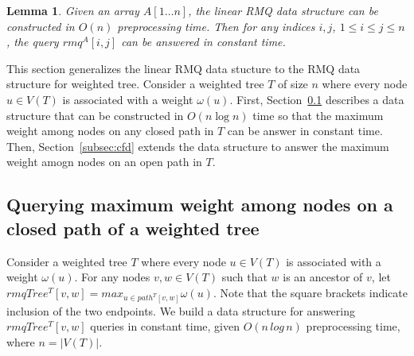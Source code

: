 \documentclass[final,1p,times]{elsarticle}
\newcommand{\weight}{\omega}
\newtheorem{lemma}[theorem]{Lemma}
\begin{document}
    \begin{lemma}
        \label{lem:linearrmq}
	    Given an array $A[1 \ldots n]$, the \textit{linear RMQ data structure} can be constructed in $O(n)$ preprocessing time. Then for any indices $i, j$, $1 \leq i \leq j \leq n$, the query $rmq^A[i, j]$ can be answered in constant time.
    \end{lemma}

This section generalizes the linear RMQ data stucture to the RMQ data structure for weighted tree.
Consider a weighted tree $T$ of size $n$ where every node $u \in V(T)$ is associated with a weight $\weight(u)$.
First, Section~\ref{subsec:rmqtreeinc} describes a data structure that can be constructed in $O(n \log n)$ time so that the maximum weight among nodes on any closed path in $T$ can be answer in constant time.
Then, Section~\ref{subsec:cfd} extends the data structure to answer the maximum weight amogn nodes on an open path in $T$.


    \subsection{Querying maximum weight among nodes on a closed path of a weighted tree}
    \label{subsec:rmqtreeinc}

    Consider a weighted tree $T$ where every node $u \in V(T)$ is associated with a weight $\weight(u)$. For any nodes $v, w \in V(T)$ such that $w$ is an ancestor of $v$, let $rmqTree^T[v, w] = max_{u \in path^T[v, w]}\weight(u)$. Note that the square brackets indicate inclusion of the two endpoints. We build a data structure for answering $rmqTree^T[v, w]$ queries in constant time, given $O(n\,log\,n)$ preprocessing time, where $n = |V(T)|$.
\end{document}
